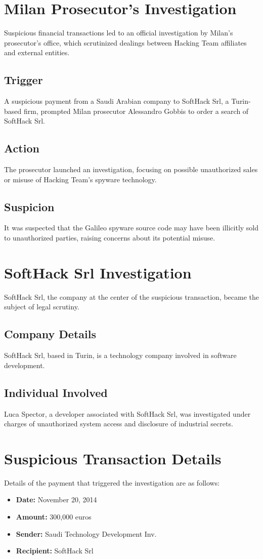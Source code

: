 \section{Milan Prosecutor's Investigation}
Suspicious financial transactions led to an official investigation by Milan’s prosecutor’s office, which scrutinized dealings between Hacking Team affiliates and external entities.
\subsection{Trigger}
A suspicious payment from a Saudi Arabian company to SoftHack Srl, a Turin-based firm, prompted Milan prosecutor Alessandro Gobbis to order a search of SoftHack Srl.
\subsection{Action}
The prosecutor launched an investigation, focusing on possible unauthorized sales or misuse of Hacking Team's spyware technology.
\subsection{Suspicion}
It was suspected that the Galileo spyware source code may have been illicitly sold to unauthorized parties, raising concerns about its potential misuse.

\section{SoftHack Srl Investigation}
SoftHack Srl, the company at the center of the suspicious transaction, became the subject of legal scrutiny.
\subsection{Company Details}
SoftHack Srl, based in Turin, is a technology company involved in software development.
\subsection{Individual Involved}
Luca Spector, a developer associated with SoftHack Srl, was investigated under charges of unauthorized system access and disclosure of industrial secrets.

\section{Suspicious Transaction Details}
Details of the payment that triggered the investigation are as follows:
\begin{itemize}
    \item \textbf{Date:} November 20, 2014
    \item \textbf{Amount:} 300,000 euros
    \item \textbf{Sender:} Saudi Technology Development Inv.
    \item \textbf{Recipient:} SoftHack Srl
\end{itemize}

